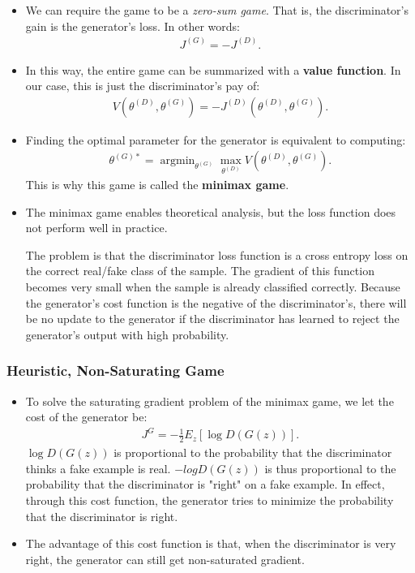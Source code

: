 \documentclass[10pt]{article}
\DeclareMathOperator*{\argmin}{argmin}
\begin{document}
  \begin{itemize}
    \item We can require the game to be a \emph{zero-sum game}. That is, the discriminator's gain is the generator's loss. In other words:
    \begin{align*}
      J^{(G)} = -J^{(D)}.
    \end{align*}

    \item In this way, the entire game can be summarized with a \textbf{value function}. In our case, this is just the discriminator's pay of:
    \begin{align*}
      V(\theta^{(D)}, \theta^{(G)}) 
      = -J^{(D)}(\theta^{(D)}, \theta^{(G)}).
    \end{align*}

    \item Finding the optimal parameter for the generator is equivalent to computing:
    \begin{align*}
      \theta^{(G)*} = \argmin_{\theta^{(G)}} \max_{\theta^{(D)}} V(\theta^{(D)}, \theta^{(G)}).
    \end{align*}
    This is why this game is called the \textbf{minimax game}.

    \item The minimax game enables theoretical analysis, but the loss function does not perform well in practice. 

    The problem is that the discriminator loss function is a cross entropy loss on the correct real/fake class of the sample. The gradient of this function becomes very small when the sample is already classified correctly. Because the generator's cost function is the negative of the discriminator's, there will be no update to the generator if the discriminator has learned to reject the generator's output with high probability.
  \end{itemize}

  \subsubsection{Heuristic, Non-Saturating Game}

  \begin{itemize}
    \item To solve the saturating gradient problem of the minimax game, we let the cost of the generator be:
    \begin{align*}
      J^{G} = -\frac{1}{2} E_z[\log D(G(z))].
    \end{align*}
    $\log D(G(z))$ is proportional to the probability that the discriminator thinks a fake example is real. $-log D(G(z))$ is thus proportional to the probability that the discriminator is "right" on a fake example. In effect, through this cost function, the generator tries to minimize the probability that the discriminator is right.

    \item The advantage of this cost function is that, when the discriminator is very right, the generator can still get non-saturated gradient.    
  \end{itemize}
\end{document}

